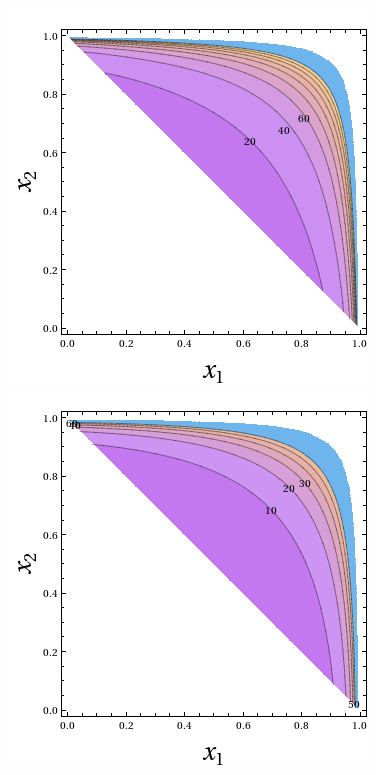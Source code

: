 \begin{figure}[h!]
\begin{center}
\begin{minipage}{0.40\linewidth}
\end{minipage}
\end{center}
\begin{center}
\begin{minipage}{0.40\linewidth}
\includegraphics[width=\linewidth]{images/ms1undsw.png}
\end{minipage}
\hfill
\begin{minipage}{0.40\linewidth}
\includegraphics[width=\linewidth]{images/ann.png}

\end{minipage}
\end{center}
\end{figure}
